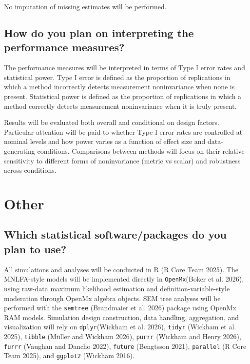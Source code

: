 \documentclass[
  man,
  floatsintext]{apa7}
\begin{document}
No imputation of missing estimates will be performed.

\subsection{How do you plan on interpreting the performance
measures?}\label{how-do-you-plan-on-interpreting-the-performance-measures}

The performance measures will be interpreted in terms of Type I error
rates and statistical power. Type I error is defined as the proportion
of replications in which a method incorrectly detects measurement
noninvariance when none is present. Statistical power is defined as the
proportion of replications in which a method correctly detects
measurement noninvariance when it is truly present.

Results will be evaluated both overall and conditional on design
factors. Particular attention will be paid to whether Type I error rates
are controlled at nominal levels and how power varies as a function of
effect size and data-generating conditions. Comparisons between methods
will focus on their relative sensitivity to different forms of
noninvariance (metric vs scalar) and robustness across conditions.

\section{Other}\label{other}

\subsection{Which statistical software/packages do you plan to
use?}\label{which-statistical-softwarepackages-do-you-plan-to-use}

All simulations and analyses will be conducted in R (R Core Team 2025).
The MNLFA-style models will be implemented directly in
\texttt{OpenMx}(Boker et al. 2026), using raw-data maximum likelihood
estimation and definition-variable-style moderation through OpenMx
algebra objects. SEM tree analyses will be performed with the
\texttt{semtree} (Brandmaier et al. 2026) package using OpenMx RAM
models. Simulation design construction, data handling, aggregation, and
visualization will rely on \texttt{dplyr}(Wickham et al. 2026),
\texttt{tidyr} (Wickham et al. 2025), \texttt{tibble} (Müller and
Wickham 2026), \texttt{purrr} (Wickham and Henry 2026), \texttt{furrr}
(Vaughan and Dancho 2022), \texttt{future} (Bengtsson 2021),
\texttt{parallel} (R Core Team 2025), and \texttt{ggplot2} (Wickham
2016).
\end{document}

